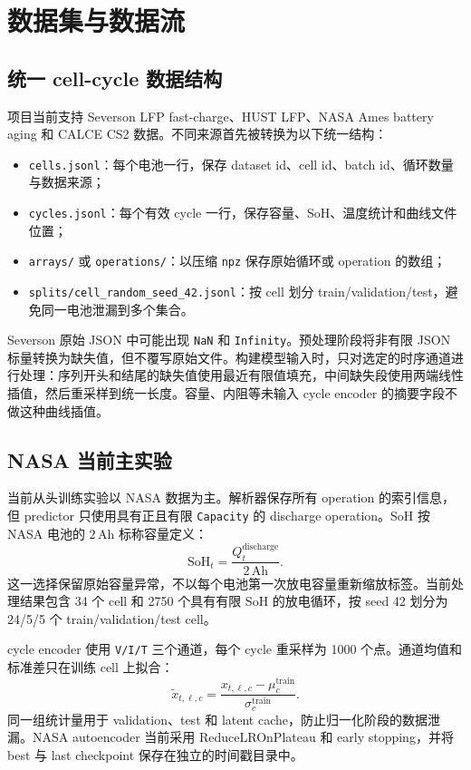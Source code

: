 \documentclass[11pt,a4paper,fontset=none]{ctexart}
\begin{document}
\section{数据集与数据流}

\subsection{统一 cell-cycle 数据结构}

项目当前支持 Severson LFP fast-charge、HUST LFP、NASA Ames battery aging 和 CALCE CS2 数据。不同来源首先被转换为以下统一结构：
\begin{itemize}
  \item \texttt{cells.jsonl}：每个电池一行，保存 dataset id、cell id、batch id、循环数量与数据来源；
  \item \texttt{cycles.jsonl}：每个有效 cycle 一行，保存容量、SoH、温度统计和曲线文件位置；
  \item \texttt{arrays/} 或 \texttt{operations/}：以压缩 \texttt{npz} 保存原始循环或 operation 的数组；
  \item \texttt{splits/cell\_random\_seed\_42.jsonl}：按 cell 划分 train/validation/test，避免同一电池泄漏到多个集合。
\end{itemize}

Severson 原始 JSON 中可能出现 \texttt{NaN} 和 \texttt{Infinity}。预处理阶段将非有限 JSON 标量转换为缺失值，但不覆写原始文件。构建模型输入时，只对选定的时序通道进行处理：序列开头和结尾的缺失值使用最近有限值填充，中间缺失段使用两端线性插值，然后重采样到统一长度。容量、内阻等未输入 cycle encoder 的摘要字段不做这种曲线插值。

\subsection{NASA 当前主实验}

当前从头训练实验以 NASA 数据为主。解析器保存所有 operation 的索引信息，但 predictor 只使用具有正且有限 \texttt{Capacity} 的 discharge operation。SoH 按 NASA 电池的 $2\,\mathrm{Ah}$ 标称容量定义：
\[
\mathrm{SoH}_t=\frac{Q^{\mathrm{discharge}}_t}{2\,\mathrm{Ah}}.
\]
这一选择保留原始容量异常，不以每个电池第一次放电容量重新缩放标签。当前处理结果包含 34 个 cell 和 2750 个具有有限 SoH 的放电循环，按 seed 42 划分为 24/5/5 个 train/validation/test cell。

cycle encoder 使用 \texttt{V/I/T} 三个通道，每个 cycle 重采样为 1000 个点。通道均值和标准差只在训练 cell 上拟合：
\[
\tilde x_{t,\ell,c}
=
\frac{x_{t,\ell,c}-\mu^{\mathrm{train}}_c}
{\sigma^{\mathrm{train}}_c}.
\]
同一组统计量用于 validation、test 和 latent cache，防止归一化阶段的数据泄漏。NASA autoencoder 当前采用 ReduceLROnPlateau 和 early stopping，并将 best 与 last checkpoint 保存在独立的时间戳目录中。
\end{document}
